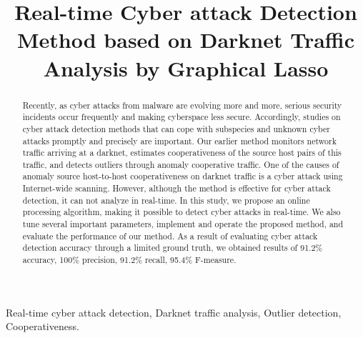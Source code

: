\documentclass[conference]{IEEEtran}
\begin{document}
\title{
  Real-time Cyber attack Detection Method based on Darknet Traffic Analysis by Graphical Lasso
}

\author{
}


\maketitle

\begin{abstract}
Recently, as cyber attacks from malware are evolving more and more, serious security incidents occur frequently and making cyberspace less secure.
Accordingly, studies on cyber attack detection methods that can cope with subspecies and unknown cyber attacks promptly and precisely are important.
Our earlier method monitors network traffic arriving at a darknet, estimates cooperativeness of the source host pairs of this traffic, and detects outliers through anomaly cooperative traffic.
One of the causes of anomaly source host-to-host cooperativeness on darknet traffic is a cyber attack using Internet-wide scanning.
However, although the method is effective for cyber attack detection, it can not analyze in real-time.
In this study, we propose an online processing algorithm, making it possible to detect cyber attacks in real-time.
We also tune several important parameters, implement and operate the proposed method, and evaluate the performance of our method.
As a result of evaluating cyber attack detection accuracy through a limited ground truth, we obtained results of 91.2\% accuracy, 100\% precision, 91.2\% recall, 95.4\% F-measure.
\end{abstract}

\begin{IEEEkeywords}
Real-time cyber attack detection, Darknet traffic analysis, Outlier detection, Cooperativeness.
\end{IEEEkeywords}
\end{document}
